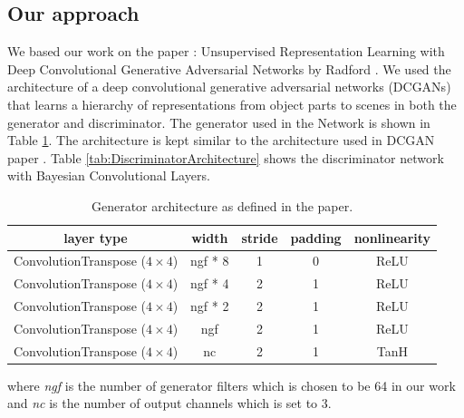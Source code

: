 \subsection{Our approach}

We based our work on the paper :  Unsupervised Representation Learning with Deep Convolutional Generative Adversarial Networks by Radford \cite{DBLP:journals/corr/RadfordMC15}. We used the architecture of a deep convolutional generative adversarial networks (DCGANs) that learns a hierarchy of representations from object parts to scenes in both the generator and discriminator.
The generator used in the Network is shown in Table \ref{tab:GeneratorArchitecture}. The architecture is kept similar to the architecture used in DCGAN paper \cite{DBLP:journals/corr/RadfordMC15}. Table \ref{tab:DiscriminatorArchitecture} shows the discriminator network with Bayesian Convolutional Layers. 

\begin{table}[H]
    \centering
    \renewcommand{\arraystretch}{2}
    \begin{tabular}{c c c c c} 
 \hline
 layer type & width & stride & padding & nonlinearity \\ [0.5ex] 
 \hline
 ConvolutionTranspose ($4\times4$) & ngf * 8 & 1 & 0  & ReLU \\ 
 

 ConvolutionTranspose ($4\times4$) & ngf * 4 & 2 & 1  & ReLU \\
 
 
 ConvolutionTranspose ($4\times4$) & ngf * 2 & 2 & 1 & ReLU \\
 
 ConvolutionTranspose ($4\times4$) & ngf & 2 & 1  & ReLU \\
 
 ConvolutionTranspose ($4\times4$) & nc & 2 & 1 & TanH \\ [1ex] 
 \hline
\end{tabular}
\renewcommand{\arraystretch}{1}
\caption{Generator architecture as defined in the paper. \cite{DBLP:journals/corr/RadfordMC15}}
\label{tab:GeneratorArchitecture}
\end{table}

where \textit{ngf} is the number of generator filters which is chosen to be 64 in our work and \textit{nc} is the number of output channels which is set to 3. 

